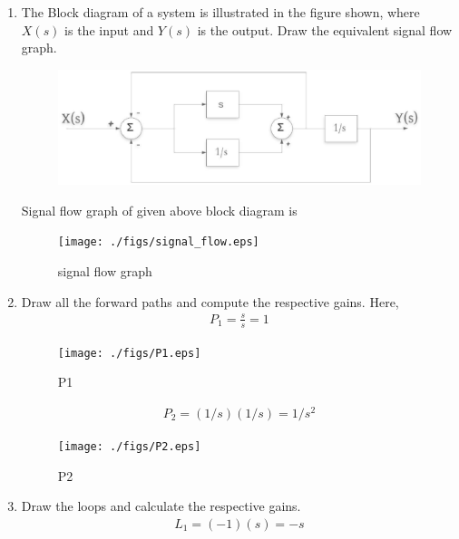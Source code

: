 \begin{enumerate}[label=\thesection.\arabic*.,ref=\thesection.\theenumi]

\item The Block diagram of a system is illustrated in the figure shown, where $X(s)$ is the input and $Y(s)$ is the output. Draw the equivalent signal flow graph.
\renewcommand{\thefigure}{\theenumi.\arabic{figure}}

\begin{figure}[!ht]
\centering
\includegraphics[width=\columnwidth]{./figs/pic1.eps}
\caption{}
\label{fig:sec_order}
\end{figure}
\solution
Signal flow graph of given above block diagram is
\begin{figure}[!ht]
\centering
\texttt{[image: ./figs/signal\_flow.eps]}
\caption{signal flow graph}
\label{fig:sec_order}
\end{figure}
%
\renewcommand{\thefigure}{\theenumi}
\item Draw all the forward paths and compute the respective gains.
\renewcommand{\thefigure}{\theenumi.\arabic{figure}}
\solution
Here, 
\begin{align}
P_1=\frac{s}{s}=1
\end{align}

\begin{figure}[!ht]
\centering
\texttt{[image: ./figs/P1.eps]}
\caption{P1}
\label{fig:sec_order}
\end{figure}

 
\begin{align}
P_2=(1/s)(1/s)=1/s^2
\end{align}

\begin{figure}[!ht]
\centering
\texttt{[image: ./figs/P2.eps]}
\caption{P2}
\label{fig:sec_order}
\end{figure}
\renewcommand{\thefigure}{\theenumi}

\item Draw the loops and calculate the respective gains.\renewcommand{\thefigure}{\theenumi.\arabic{figure}}
\\
\solution 
\begin{align}
L_1=(-1)(s)=-s
\end{align}


\end{enumerate}
